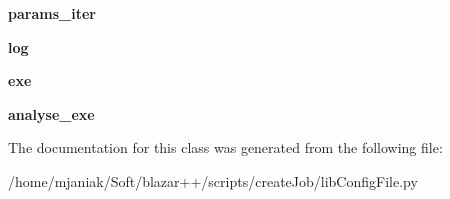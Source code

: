 \begin{DoxyCompactItemize}
\item 
\hypertarget{classlibConfigFile_1_1configFile_a038a6a2809f2bf988a843d359d45cce4}{{\bfseries params\-\_\-iter}}\label{classlibConfigFile_1_1configFile_a038a6a2809f2bf988a843d359d45cce4}

\item 
\hypertarget{classlibConfigFile_1_1configFile_a33525598d1b2b2359305272a32b0b8cb}{{\bfseries log}}\label{classlibConfigFile_1_1configFile_a33525598d1b2b2359305272a32b0b8cb}

\item 
\hypertarget{classlibConfigFile_1_1configFile_a84fa89995847d5004aa634628efabca3}{{\bfseries exe}}\label{classlibConfigFile_1_1configFile_a84fa89995847d5004aa634628efabca3}

\item 
\hypertarget{classlibConfigFile_1_1configFile_a7e268040fbf058e6db51120fe4dd47a7}{{\bfseries analyse\-\_\-exe}}\label{classlibConfigFile_1_1configFile_a7e268040fbf058e6db51120fe4dd47a7}

\end{DoxyCompactItemize}


The documentation for this class was generated from the following file\-:\begin{DoxyCompactItemize}
\item 
/home/mjaniak/\-Soft/blazar++/scripts/create\-Job/lib\-Config\-File.\-py\end{DoxyCompactItemize}
